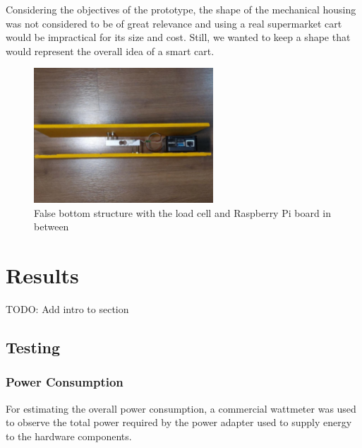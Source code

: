 \documentclass[openright]{normas-utf-tex} %
\begin{document}
Considering the objectives of the prototype, the shape of the mechanical
housing was not considered to be of great relevance and using a real
supermarket cart would be impractical for its size and cost. Still, we wanted
to keep a shape that would represent the overall idea of a smart cart.

\begin{figure}[H]
	\centering
	\includegraphics[width=0.6\textwidth]{./images/cartbase2.jpeg}
	\caption[False bottom structure with the load cell and Raspberry Pi board in between]{False bottom structure with the load cell and Raspberry Pi board in between}
\end{figure}

\chapter{Results}

TODO: Add intro to section

\section{Testing}

\subsection{Power Consumption}

For estimating the overall power consumption, a commercial wattmeter was used
to observe the total power required by the power adapter used to supply energy
to the hardware components.
\end{document}
